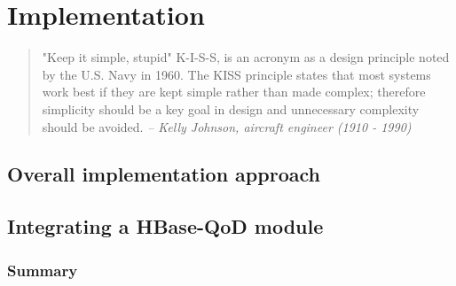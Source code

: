 \chapter{Implementation}\label{ch:implemenation}

\begin{quotation}
"Keep it simple, stupid" K-I-S-S, is an acronym as a design principle noted by the U.S. Navy in 1960. The KISS principle states that most systems work best if they are kept simple rather than made complex; therefore simplicity should be a key goal in design and unnecessary complexity should be avoided.
{\small\it -- Kelly Johnson, aircraft engineer (1910 - 1990)}
\end{quotation}

\section{Overall implementation approach}\label{approach}
\section{Integrating a HBase-QoD module}\label{integration}

\subsection*{Summary}\label{summary-implementation}

